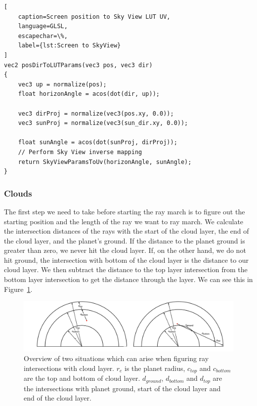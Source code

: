 \documentclass{ctuthesis}
\begin{document}
\begin{lstlisting}[ 
    caption=Screen position to Sky View LUT UV,
    language=GLSL,
    escapechar=\%,
    label={lst:Screen to SkyView}
]
vec2 posDirToLUTParams(vec3 pos, vec3 dir)
{
    vec3 up = normalize(pos);
    float horizonAngle = acos(dot(dir, up));

    vec3 dirProj = normalize(vec3(pos.xy, 0.0));
    vec3 sunProj = normalize(vec3(sun_dir.xy, 0.0));

    float sunAngle = acos(dot(sunProj, dirProj));
    // Perform Sky View inverse mapping
    return SkyViewParamsToUv(horizonAngle, sunAngle);
}
\end{lstlisting}

\subsubsection{Clouds}
The first step we need to take before starting the ray march is to figure out the starting position and 
the length of the ray we want to ray march. We calculate the intersection distances of the rays with the start
of the cloud layer, the end of the cloud layer, and the planet's ground. If the distance to the planet ground is
greater than zero, we never hit the cloud layer. If, on the other hand, we do not hit ground, the 
intersection with bottom of the cloud layer is the distance to our cloud layer. We then subtract
the distance to the top layer intersection from the bottom layer intersection to get the distance through the 
layer. We can see this in Figure~\ref{fig:Cloud layer intersections}.

\begin{figure}
        \includegraphics[width=1.0\textwidth]{media/Ground_cloud_intersections.png}
        \caption[Ray intersection situations]{Overview of two situations which can arise when figuring ray intersections
            with cloud layer. $r_{e}$ is the planet radius, $c_{top}$ and $c_{bottom}$ are the
            top and bottom of cloud layer. $d_{ground}$, $d_{bottom}$ and $d_{top}$ are the 
            intersections with planet ground, start of the cloud layer and end of the cloud layer.}
        \label{fig:Cloud layer intersections}
\end{figure}
\end{document}

